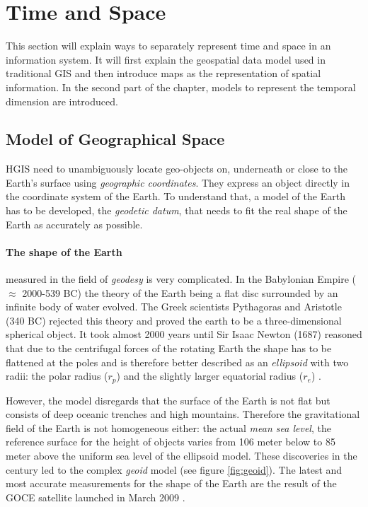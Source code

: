 \section{Time and Space} %
\label{sec:time_and_space}

This section will explain ways to separately represent time and space in an information system. It will first explain the geospatial data model used in traditional GIS and then introduce maps as the representation of spatial information. In the second part of the chapter, models to represent the temporal dimension are introduced.

\subsection{Model of Geographical Space} %
\label{sub:model_of_geographical_space}

HGIS need to unambiguously locate geo-objects on, underneath or close to the Earth's surface using \emph{geographic coordinates}. They express an object directly in the coordinate system of the Earth. To understand that, a model of the Earth has to be developed, the \emph{geodetic datum}, that needs to fit the real shape of the Earth as accurately as possible.

\paragraph{The shape of the Earth} %
\label{par:the_shape_of_the_earth}

measured in the field of \emph{geodesy} is very complicated. In the Babylonian Empire ($\approx$ 2000-539 BC) the theory of the Earth being a flat disc surrounded by an infinite body of water
evolved. The Greek scientists Pythagoras and Aristotle (340 BC) rejected this theory and proved the earth to be a three-dimensional spherical object. It took almost 2000 years until Sir Isaac Newton (1687) reasoned that due to the centrifugal forces of the rotating Earth the shape has to be flattened at the poles and is therefore better described as an \emph{ellipsoid} with two radii: the polar radius ($r_p$) and the slightly larger equatorial radius ($r_e$)
\cite[pp. 69-77]{bolstad2008gis}.

However, the model disregards that the surface of the Earth is not flat but consists of deep oceanic trenches and high mountains. Therefore the gravitational field of the Earth is not homogeneous either: the actual \emph{mean sea level}, the reference surface for the height of objects varies from 106 meter below to 85 meter above the uniform sea level of the ellipsoid model. These discoveries in the  century led to the complex \emph{geoid} model (see figure \ref{fig:geoid}). The latest and most accurate measurements for the shape of the Earth are the result of the GOCE satellite launched in March 2009
\cite{geoid, geoidESRI}.

